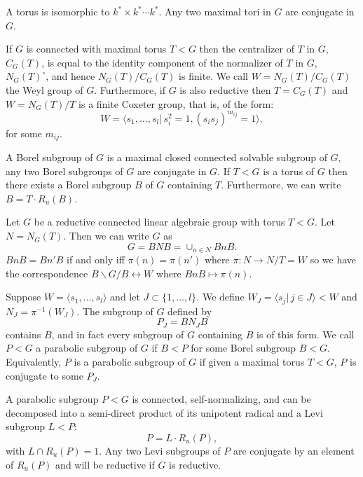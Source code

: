 A torus is isomorphic to $k^*\times k^*\cdots k^*$. Any two maximal tori in $G$ are conjugate in $G$. 

If $G$ is connected with maximal torus $T<G$ then the centralizer of $T$ in $G$, $C_G(T)$, is equal to the identity component of the normalizer of $T$ in $G$, $N_G(T)^\circ$, and hence $N_G(T)/C_G(T)$ is finite. We call $W = N_G(T)/C_G(T)$ the Weyl group of $G$. Furthermore, if $G$ is also reductive then $T=C_G(T)$ and $W = N_G(T)/T$ is a finite Coxeter group, that is, of the form:
\begin{displaymath}
  W = \langle s_1, \ldots, s_l |\, s_i^2 = 1, (s_is_j)^{m_{ij}} = 1\rangle,
\end{displaymath}
for some $m_{ij}$.

A Borel subgroup of $G$ is a maximal closed connected solvable subgroup of $G$, any two Borel subgroups of $G$ are conjugate in $G$. If $T < G$ is a torus of $G$ then there exists a Borel subgroup $B$ of $G$ containing $T$. Furthermore, we can write $B = T\cdot R_u(B)$.

Let $G$ be a reductive connected linear algebraic group with torus $T < G$. Let $N = N_G(T)$. Then we can write $G$ as
\begin{displaymath}
	G = BNB = \cup_{n\in N}BnB.
\end{displaymath}
$BnB = Bn'B$ if and only iff $\pi(n)=\pi(n')$ where $\pi:N\rightarrow N/T = W$ so we have the correspondence $B\backslash G/B \leftrightarrow W$ where $BnB \mapsto \pi(n)$.

Suppose $W = \langle s_1, \ldots, s_l\rangle$ and let $J \subset \{1, \ldots, l\}$. We define $W_J = \langle s_j |\, j\in J\rangle < W$ and $N_J = \pi^{-1}(W_J)$. The subgroup of $G$ defined by
\begin{displaymath}
	P_J = BN_JB
\end{displaymath}
contains $B$, and in fact every subgroup of $G$ containing $B$ is of this form. We call $P<G$ a parabolic subgroup of $G$ if $B<P$ for some Borel subgroup $B<G$. Equivalently, $P$ is a parabolic subgroup of $G$ if given a maximal torus $T<G$, $P$ is conjugate to some $P_J$. 

A parabolic subgroup $P<G$ is connected, self-normalizing, and can be decomposed into a semi-direct product of its unipotent radical and a Levi subgroup $L<P$:
\begin{displaymath}
	P = L\cdot R_u(P),
\end{displaymath}
with $L\cap R_u(P) = 1$. Any two Levi subgroups of $P$ are conjugate by an element of $R_u(P)$ and will be reductive if $G$ is reductive.

